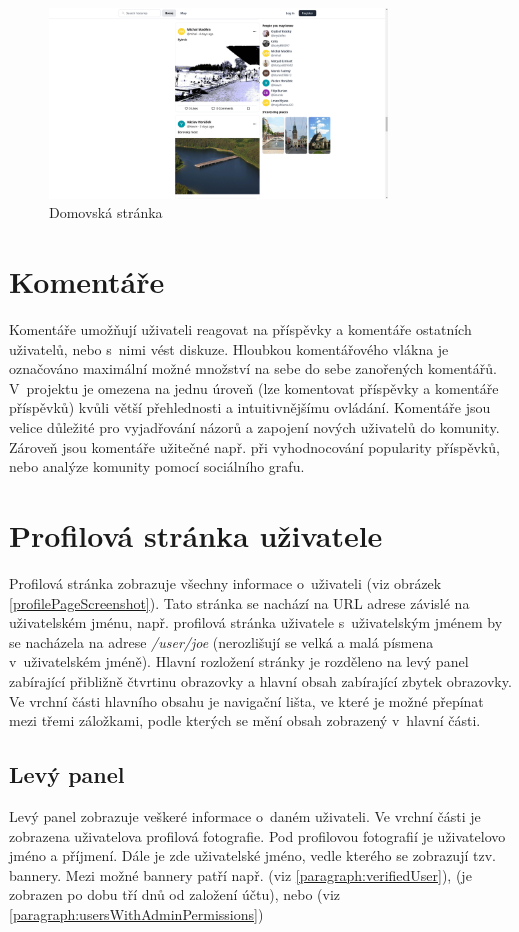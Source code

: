 \documentclass[12pt, a4paper,
  oneside,      %
]{report}
\begin{document}
\begin{figure}[h]
	\centering
	\includegraphics[width=0.8\textwidth]{images/home_page.png}
	\caption{Domovská stránka}\label{figure:homePagePreview}
\end{figure}

\section{Komentáře}
Komentáře umožňují uživateli reagovat na příspěvky a komentáře ostatních uživatelů, nebo s~nimi vést diskuze. Hloubkou komentářového vlákna je označováno maximální možné množství na sebe do sebe zanořených komentářů. V~projektu je omezena na jednu úroveň (lze komentovat příspěvky a komentáře příspěvků) kvůli větší přehlednosti a intuitivnějšímu ovládání. Komentáře jsou velice důležité pro vyjadřování názorů a zapojení nových uživatelů do komunity. Zároveň jsou komentáře užitečné např. při vyhodnocování popularity příspěvků, nebo analýze komunity pomocí sociálního grafu.
\cite{whyAreCommentsImportant}

\section{Profilová stránka uživatele}
Profilová stránka zobrazuje všechny informace o~uživateli (viz obrázek \ref{profilePageScreenshot}). Tato stránka se nachází na URL adrese závislé na uživatelském jménu, např. profilová stránka uživatele s~uživatelským jménem  by se nacházela na adrese \textit{/user/joe} (nerozlišují se velká a malá písmena v~uživatelském jméně). Hlavní rozložení stránky je rozděleno na levý panel zabírající přibližně čtvrtinu obrazovky a hlavní obsah zabírající zbytek obrazovky. Ve vrchní části hlavního obsahu je navigační lišta, ve které je možné přepínat mezi třemi záložkami, podle kterých se mění obsah zobrazený v~hlavní části.
\subsection{Levý panel}
Levý panel zobrazuje veškeré informace o~daném uživateli. Ve vrchní části je zobrazena uživatelova profilová fotografie. Pod profilovou fotografií je uživatelovo jméno a příjmení. Dále je zde uživatelské jméno, vedle kterého se zobrazují tzv. bannery. Mezi možné bannery patří např.  (viz \ref{paragraph:verifiedUser}),  (je zobrazen po dobu tří dnů od založení účtu), nebo  (viz \ref{paragraph:usersWithAdminPermissions})
\end{document}
